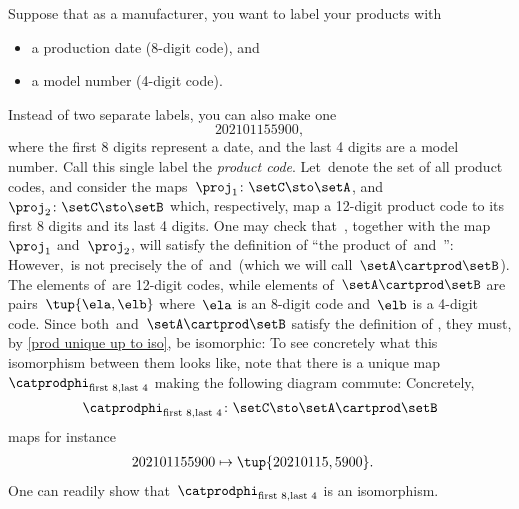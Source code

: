 \begin{example}
    \label{ex:univ-prop-prod}
    Suppose that as a manufacturer, you want to label your products with
    \begin{itemize}
        \item a production date (8-digit code), and
        \item a model number (4-digit code).
    \end{itemize}
    Instead of two separate labels, you can also make one
    \begin{equation}
        \label{eq:exa-prod-univ-prop-code}
        202101155900,
    \end{equation}
    where the first 8 digits represent a date, and the last 4 digits are a model number.
    Call this single label the \emph{product code}.
    Let~\setC denote the set of all product codes, and consider the maps~$\proj_1\colon \setC \sto \setA$, and~$\proj_2\colon \setC \sto \setB$ which, respectively, map a 12-digit product code to its first 8 digits and its last 4 digits.
    One may check that~\setC, together with the map~$\proj_1$ and~$\proj_2$, will satisfy the definition of ``the product of~\setA and~\setB'':
    However,~\setC is not precisely the  of~\setA and~\setB (which we will call~$\setA\cartprod \setB$).
    The elements of~\setC are 12-digit codes, while elements of~$\setA\cartprod \setB$ are pairs~$\tup{\ela,\elb}$ where~$\ela$ is an 8-digit code and~$\elb$ is a 4-digit code.
    Since both~\setC and~$\setA\cartprod \setB$ satisfy the definition of , they must, by \cref{prod unique up to iso}, be isomorphic:
    To see concretely what this isomorphism between them looks like, note that there is a unique map $\catprodphi_{\text{first 8},\text{last 4}}$ making the following diagram commute: %
    Concretely,
    \begin{equation}
        \label{eq:exa-univ-iso}
        \catprodphi_{\text{first 8},\text{last 4}}\colon \setC \sto \setA\cartprod \setB
    \end{equation}
    maps for instance
    \begin{equation}
        \label{eq:exa-univ-iso-concrete}
        \begin{aligned}
            202101155900 & \mapsto \tup{20210115,5900}.
        \end{aligned}
    \end{equation}
    One can readily show that~$\catprodphi_{\text{first 8},\text{last 4}}$ is an isomorphism.
\end{example}

